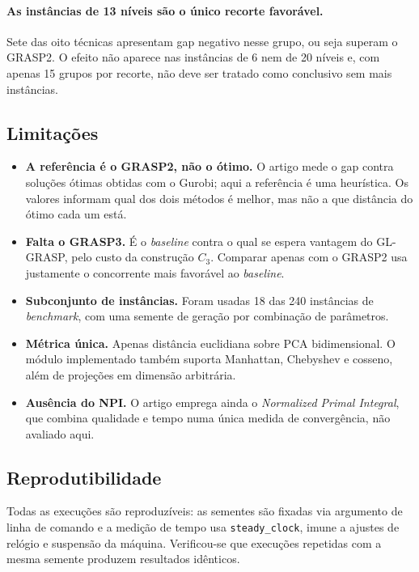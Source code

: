 \documentclass[12pt,a4paper]{article}
\begin{document}
\paragraph{As instâncias de 13 níveis são o único recorte favorável.}
Sete das oito técnicas apresentam gap negativo nesse grupo, ou seja
superam o GRASP2. O efeito não aparece nas instâncias de 6 nem de 20
níveis e, com apenas 15 grupos por recorte, não deve ser tratado como
conclusivo sem mais instâncias.

\subsection{Limitações}

\begin{itemize}
  \item \textbf{A referência é o GRASP2, não o ótimo.} O artigo mede o
        gap contra soluções ótimas obtidas com o Gurobi; aqui a
        referência é uma heurística. Os valores informam qual dos dois
        métodos é melhor, mas não a que distância do ótimo cada um está.
  \item \textbf{Falta o GRASP3.} É o \textit{baseline} contra o qual se
        espera vantagem do GL-GRASP, pelo custo da construção $C_3$.
        Comparar apenas com o GRASP2 usa justamente o concorrente mais
        favorável ao \textit{baseline}.
  \item \textbf{Subconjunto de instâncias.} Foram usadas 18 das 240
        instâncias de \textit{benchmark}, com uma semente de geração por
        combinação de parâmetros.
  \item \textbf{Métrica única.} Apenas distância euclidiana sobre PCA
        bidimensional. O módulo implementado também suporta Manhattan,
        Chebyshev e cosseno, além de projeções em dimensão arbitrária.
  \item \textbf{Ausência do NPI.} O artigo emprega ainda o
        \textit{Normalized Primal Integral}, que combina qualidade e
        tempo numa única medida de convergência, não avaliado aqui.
\end{itemize}

\subsection{Reprodutibilidade}

Todas as execuções são reproduzíveis: as sementes são fixadas via
argumento de linha de comando e a medição de tempo usa
\texttt{steady\_clock}, imune a ajustes de relógio e suspensão da
máquina. Verificou-se que execuções repetidas com a mesma semente
produzem resultados idênticos.
\end{document}
